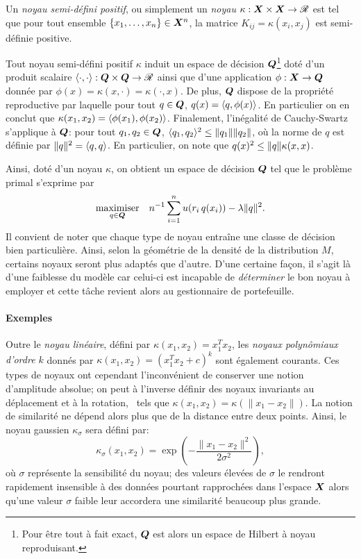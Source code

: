 \begin{deff}
  Un \textit{noyau semi-défini positif}, ou simplement un \textit{noyau}
  $\kappa:\X\times\X\to\Re$ est tel que pour tout ensemble $\{x_1,\ldots,x_n\}\in\X^n$, la matrice
  $K_{ij} = \kappa(x_i,x_j)$ est semi-définie positive.
\end{deff}

\begin{prop}
  Tout noyau semi-défini positif $\kappa$ induit un espace de décision $\Q$\footnote{Pour être
    tout à fait exact, $\Q$ est alors un espace de Hilbert à noyau reproduisant.} doté
  d'un produit scalaire $\inp{\cdot,\cdot}:\Q\times\Q\to\Re$ ainsi que d'une application
  $\phi:\X\to\Q$ donnée par $\phi(x) = \kappa(x,\cdot) = \kappa(\cdot,x)$. De plus, $\Q$ dispose de la propriété
  reproductive par laquelle pour tout $q \in \Q$, $q(x) = \inp{q,\phi(x)}$. En particulier on
  en conclut que $\kappa(x_1,x_2) = \inp{\phi(x_1),\phi(x_2)}$. Finalement, l'inégalité de
  Cauchy-Swartz s'applique à $\Q$: pour tout $q_1,q_2\in\Q$,
  $\inp{q_1,q_2}^2 \leq \nq{q_1}\nq{q_2}$, où la norme de $q$ est définie par
  $\nq{q}^2 = \inp{q,q}$. En particulier, on note que $q(x)^2 \leq \nq{q}\kappa(x,x)$.
\end{prop}

Ainsi, doté d'un noyau $\kappa$, on obtient un espace de décision $\Q$ tel que le problème
primal s'exprime par
\begin{equation}
  \maximizeEquation[q \in \Q]{n^{-1}\sumi u(r_i\,q(x_i)) - \lambda\nq{q}^2.}
\end{equation}
Il convient de noter que chaque type de noyau entraîne une classe de décision bien
particulière. Ainsi, selon la géométrie de la densité de la distribution $M$, certains
noyaux seront plus adaptés que d'autre. D'une certaine façon, il s'agit là d'une faiblesse
du modèle car celui-ci est incapable de \textit{déterminer} le bon noyau à employer et
cette tâche revient alors au gestionnaire de portefeuille.

\paragraph{Exemples}

Outre le \textit{noyau linéaire}, défini par $\kappa(x_1,x_2) = x_1^Tx_2$, les \textit{noyaux
  polynômiaux d'ordre $k$} donnés par $\kappa(x_1,x_2) = (x_1^Tx_2 +c)^k$ sont également
courants. Ces types de noyaux ont cependant l'inconvénient de conserver une notion
d'amplitude absolue; on peut à l'inverse définir des noyaux invariants au déplacement et à
la rotation, \ie\ tels que $\kappa(x_1,x_2) = \kappa(\|x_1-x_2\|)$. La notion de similarité ne
dépend alors plus que de la distance entre deux points. Ainsi, le noyau gaussien
$\kappa_\sigma$ sera défini par:
\begin{equation}
  \kappa_\sigma(x_1,x_2) = \exp\left(-\frac{\|x_1-x_2\|^2}{2\sigma^2}\right),
\end{equation}
où $\sigma$ représente la sensibilité du noyau; des valeurs élevées de $\sigma$ le rendront
rapidement insensible à des données pourtant rapprochées dans l'espace $\X$ alors qu'une
valeur $\sigma$ faible leur accordera une similarité beaucoup plus grande.

